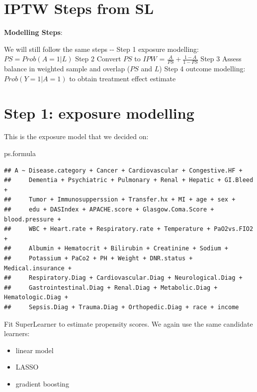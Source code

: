 \documentclass[
]{book}
\newenvironment{Shaded}{\begin{snugshade}}{\end{snugshade}}
\newcommand{\NormalTok}[1]{#1}
\providecommand{\tightlist}{%
  \setlength{\itemsep}{0pt}\setlength{\parskip}{0pt}}
\begin{document}
\hypertarget{iptw-steps-from-sl}{%
\section{IPTW Steps from SL}\label{iptw-steps-from-sl}}

\textbf{Modelling Steps}:

We will still follow the same steps
\textbar{} \textbar{} \textbar{}
\textbar-\textbar-\textbar{}
\textbar Step 1\textbar{} exposure modelling: \(PS = Prob(A=1|L)\)\textbar{}
\textbar Step 2\textbar{} Convert \(PS\) to \(IPW\) = \(\frac{A}{PS} + \frac{1-A}{1-PS}\)\textbar{}
\textbar Step 3\textbar{} Assess balance in weighted sample and overlap (\(PS\) and \(L\))\textbar{}
\textbar Step 4\textbar{} outcome modelling: \(Prob(Y=1|A=1)\) to obtain treatment effect estimate \textbar{}

\hypertarget{step-1-exposure-modelling-1}{%
\section{Step 1: exposure modelling}\label{step-1-exposure-modelling-1}}

This is the exposure model that we decided on:

\begin{Shaded}
\begin{Highlighting}[]
\NormalTok{ps.formula}
\end{Highlighting}
\end{Shaded}

\begin{verbatim}
## A ~ Disease.category + Cancer + Cardiovascular + Congestive.HF + 
##     Dementia + Psychiatric + Pulmonary + Renal + Hepatic + GI.Bleed + 
##     Tumor + Immunosupperssion + Transfer.hx + MI + age + sex + 
##     edu + DASIndex + APACHE.score + Glasgow.Coma.Score + blood.pressure + 
##     WBC + Heart.rate + Respiratory.rate + Temperature + PaO2vs.FIO2 + 
##     Albumin + Hematocrit + Bilirubin + Creatinine + Sodium + 
##     Potassium + PaCo2 + PH + Weight + DNR.status + Medical.insurance + 
##     Respiratory.Diag + Cardiovascular.Diag + Neurological.Diag + 
##     Gastrointestinal.Diag + Renal.Diag + Metabolic.Diag + Hematologic.Diag + 
##     Sepsis.Diag + Trauma.Diag + Orthopedic.Diag + race + income
\end{verbatim}

Fit SuperLearner to estimate propensity scores. We again use the same candidate learners:

\begin{itemize}
\tightlist
\item
  linear model
\item
  LASSO
\item
  gradient boosting
\end{itemize}
\end{document}
